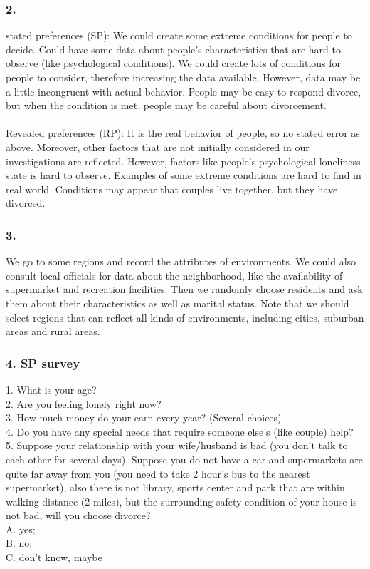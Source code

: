 \documentclass[11pt]{article}
\begin{document}
\subsubsection*{2.}
stated preferences (SP): We could create some extreme conditions for people to decide. Could have some data about people’s characteristics that are hard to observe (like psychological conditions). We could create lots of conditions for people to consider, therefore increasing the data available. However, data may be a little incongruent with actual behavior. People may be easy to respond divorce, but when the condition is met, people may be careful about divorcement.\\\\
Revealed preferences (RP): It is the real behavior of people, so no stated error as above. Moreover, other factors that are not initially considered in our investigations are reflected. However, factors like people's psychological loneliness state is hard to observe. Examples of some extreme conditions are hard to find in real world. Conditions may appear that couples live together, but they have divorced.
\subsubsection*{3.}
We go to some regions and record the attributes of environments. We could also consult local officials for data about the neighborhood, like the availability of supermarket and recreation facilities. Then we randomly choose residents and ask them about their characteristics as well as marital status. Note that we should select regions that can reflect all kinds of environments, including cities, suburban areas and rural areas.\newpage
\subsubsection*{4. SP survey}
1. What is your age?\\
2. Are you feeling lonely right now?\\
3. How much money do your earn every year? (Several choices)\\
4. Do you have any special needs that require someone else’s (like couple) help?\\
5. Suppose your relationship with your wife/husband is bad (you don't talk to each other for several days). Suppose you do not have a car and supermarkets are quite far away from you (you need to take 2 hour's bus to the nearest supermarket), also there is not library, sports center and park that are within walking distance (2 miles), but the surrounding safety condition of your house is not bad, will you choose divorce?\\
A. yes;\\
B. no;\\
C. don't know, maybe\\
\end{document}
